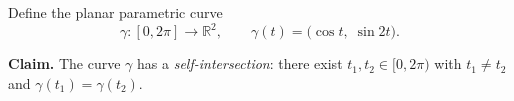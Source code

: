 \begin{problem}
Define the planar parametric curve
\[
  \gamma : [0, 2\pi] \to \mathbb{R}^{2},
  \qquad
  \gamma(t) = \bigl(\cos t,\; \sin 2t\bigr).
\]

\textbf{Claim.} The curve $\gamma$ has a \emph{self-intersection}:
there exist $t_1, t_2 \in [0, 2\pi)$ with $t_1 \neq t_2$ and
$\gamma(t_1) = \gamma(t_2)$.
\end{problem}
